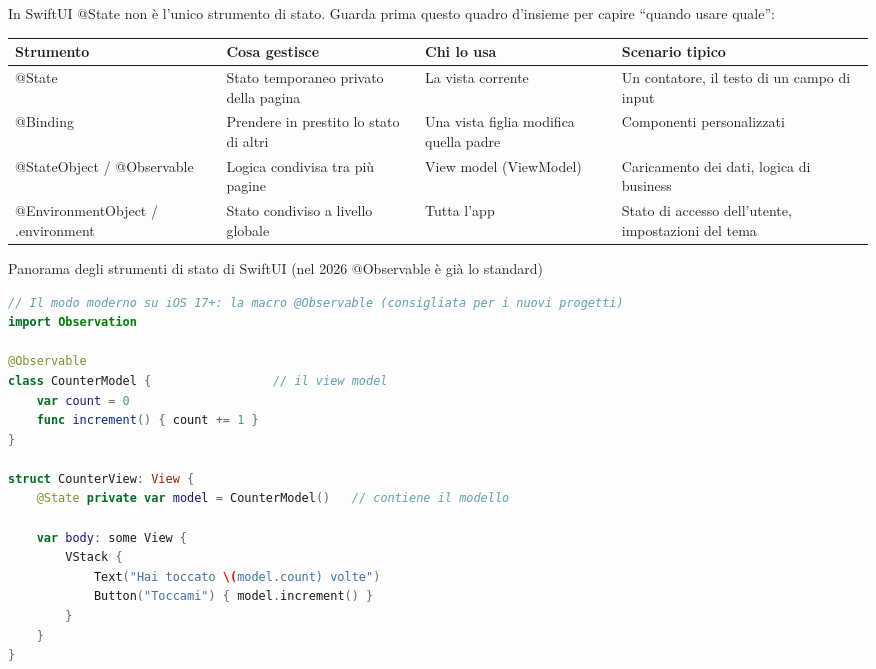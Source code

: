 


In SwiftUI @State non è l'unico strumento di stato. Guarda prima questo quadro d'insieme per capire “quando usare quale”:

\begin{center}
\begin{tabularx}{\linewidth}{|X|X|X|X|}
\hline
\textbf{Strumento} & \textbf{Cosa gestisce} & \textbf{Chi lo usa} & \textbf{Scenario tipico} \tabularnewline
\hline
@State & Stato temporaneo privato della pagina & La vista corrente & Un contatore, il testo di un campo di input \tabularnewline
@Binding & Prendere in prestito lo stato di altri & Una vista figlia modifica quella padre & Componenti personalizzati \tabularnewline
@StateObject / @Observable & Logica condivisa tra più pagine & View model (ViewModel) & Caricamento dei dati, logica di business \tabularnewline
@EnvironmentObject / .environment & Stato condiviso a livello globale & Tutta l'app & Stato di accesso dell'utente, impostazioni del tema \tabularnewline
\hline
\end{tabularx}
\end{center}

\begin{center}\small\color{gray}Panorama degli strumenti di stato di SwiftUI (nel 2026 @Observable è già lo standard)\end{center}

\begin{lstlisting}[language=Swift]
// Il modo moderno su iOS 17+: la macro @Observable (consigliata per i nuovi progetti)
import Observation

@Observable
class CounterModel {                 // il view model
    var count = 0
    func increment() { count += 1 }
}

struct CounterView: View {
    @State private var model = CounterModel()   // contiene il modello

    var body: some View {
        VStack {
            Text("Hai toccato \(model.count) volte")
            Button("Toccami") { model.increment() }
        }
    }
}
\end{lstlisting}

